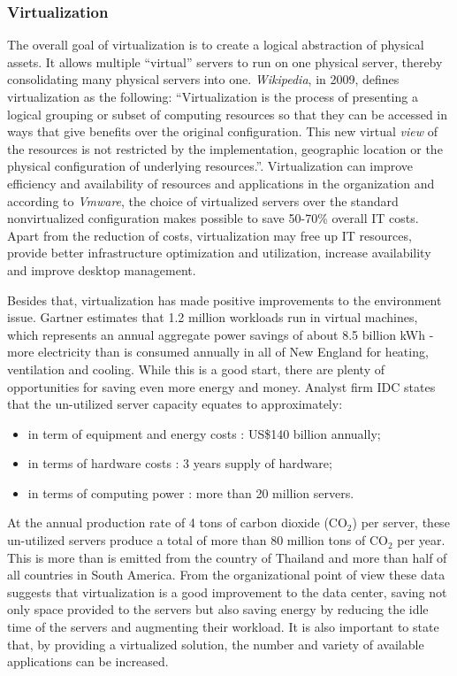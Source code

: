             \subsubsection*{Virtualization}
                The overall goal of virtualization is to create a logical abstraction of physical assets. It allows multiple ``virtual'' servers to run on one physical server, thereby consolidating many physical servers into one. \emph{Wikipedia}, in 2009, defines virtualization as the following: ``Virtualization is the process of presenting a logical grouping or subset of computing resources so that they can be accessed in ways that give benefits over the original configuration. This new virtual \emph{view} of the resources is not restricted by the implementation, geographic location or the physical configuration of underlying resources.''. Virtualization can improve efficiency and availability of resources and applications in the organization and according to \emph{Vmware}, the choice of virtualized servers over the standard nonvirtualized configuration makes possible to save 50-70\% overall IT costs. Apart from the reduction of costs, virtualization may free up IT resources, provide better infrastructure optimization and utilization, increase availability and improve desktop management.
                
                Besides that, virtualization has made positive improvements to the environment issue. Gartner \cite{GartnetStamford07} estimates that 1.2 million workloads run in virtual machines, which represents an annual aggregate power savings of about 8.5 billion kWh - more electricity than is consumed annually in all of New England for heating, ventilation and cooling. While this is a good start, there are plenty of opportunities for saving even more energy and money. Analyst firm IDC \cite{IDCDoc07} states that the un-utilized server capacity equates to approximately:
                \begin{itemize}
                    \item in term of equipment and energy costs : US\$140 billion annually;
                    \item in terms of hardware costs : 3 years supply of hardware;
                    \item in terms of computing power : more than 20 million servers.
                \end{itemize}
                At the annual production rate of 4 tons of carbon dioxide (CO$_{2}$) per server, these un-utilized servers produce a total of more than 80 million tons of CO$_{2}$ per year. This is more than is emitted from the country of Thailand and more than half of all countries in South America. From the organizational point of view these data suggests that virtualization is a good improvement to the data center, saving not only space provided to the servers but also saving energy by reducing the idle time of the servers and augmenting their workload. It is also important to state that, by providing a virtualized solution, the number and variety of available applications can be increased.
                
